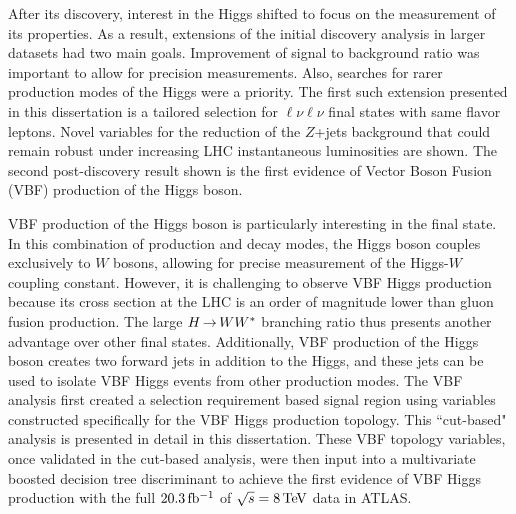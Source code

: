 After its discovery, interest in the Higgs shifted to focus on the measurement of its properties. As a result, extensions of the initial discovery analysis in larger datasets had two main goals. Improvement of signal to background ratio was important to allow for precision measurements. Also, searches for rarer production modes of the Higgs were a priority. The first such extension presented in this dissertation is a tailored selection for $\ell\nu\ell\nu$ final states with same flavor leptons. Novel variables for the reduction of the $Z$+jets background that could remain robust under increasing LHC instantaneous luminosities are shown. The second post-discovery result shown is the first evidence of Vector Boson Fusion (VBF) production of the Higgs boson. 

VBF production of the Higgs boson is particularly interesting in the \HWWfull final state. In this combination of production and decay modes, the Higgs boson couples exclusively to $W$ bosons, allowing for precise measurement of the Higgs-$W$ coupling constant. However, it is challenging to observe VBF Higgs production because its cross section at the LHC is an order of magnitude lower than gluon fusion production. The large $H{\,{\rightarrow}\,}WW^\ast$ branching ratio thus presents another advantage over other final states. Additionally, VBF production of the Higgs boson creates two forward jets in addition to the Higgs, and these jets can be used to isolate VBF Higgs events from other production modes. The VBF \HWWfull analysis first created a selection requirement based signal region using variables constructed specifically for the VBF Higgs production topology. This ``cut-based" analysis is presented in detail in this dissertation. These VBF topology variables, once validated in the cut-based analysis, were then input into a multivariate boosted decision tree discriminant to achieve the first evidence of VBF Higgs production with the full $20.3 \mbox{\,fb$^{-1}$}$ of $\sqrt{s} = 8 \TeV$ data in ATLAS. 

